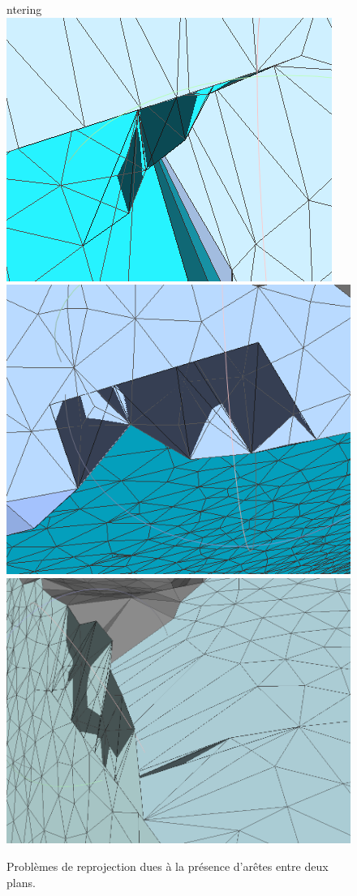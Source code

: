 ﻿\documentclass[12pt, twoside]{article}
\begin{document}
\begin{figure}[h]
ntering
\includegraphics[scale=0.55]{prob1.png} \includegraphics[scale=0.4]{prob2.png} \includegraphics[scale=0.25]{prob3.png}
\caption{\label{fig:probproj} Problèmes de reprojection dues à la présence d'arêtes entre deux plans.}
\end{figure}
\end{document}

